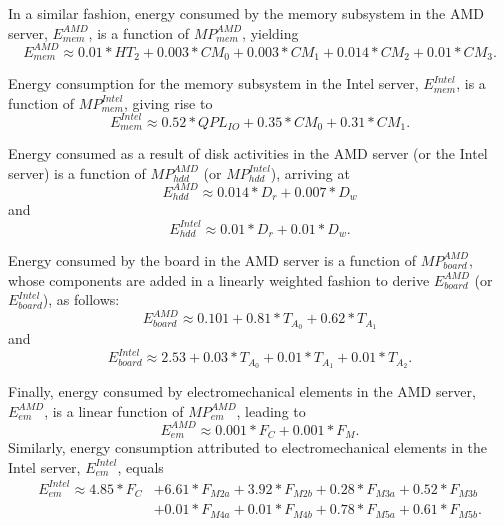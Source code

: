 In a similar fashion, energy consumed by the memory subsystem in the AMD server,
$E_{mem}^{AMD}$, is a function of $MP_{mem}^{AMD}$, yielding
\begin{equation*}
  \label{eq:apxmem}
  E_{mem}^{AMD} \approx 0.01*HT_{2}+0.003*CM_{0}+0.003*CM_{1}+0.014*CM_{2}+0.01*CM_{3}.
\end{equation*}

Energy consumption for the memory subsystem in the Intel server,
$E_{mem}^{Intel}$, is a function of $MP_{mem}^{Intel}$, giving rise to
\begin{equation*}
  E_{mem}^{Intel} \approx 0.52*QPL_{IO}+0.35*CM_{0}+0.31*CM_{1}. 
\end{equation*}

Energy consumed as a result of disk activities in the AMD server (or the
Intel server) is a function of $MP_{hdd}^{AMD}$ (or $MP_{hdd}^{Intel}$),
arriving at 
\begin{equation*}
E_{hdd}^{AMD} \approx 0.014*D_{r}+0.007*D_{w}
\end{equation*}
and
\begin{equation*}
E_{hdd}^{Intel} \approx 0.01*D_{r}+0.01*D_{w}.
\end{equation*}

Energy consumed by the board in the AMD server is a function of $MP_{board}^{AMD}$,
whose components are added in a linearly weighted fashion to derive
$E_{board}^{AMD}$ (or $E_{board}^{Intel}$), as follows:
\begin{equation*}
E_{board}^{AMD} \approx 0.101+0.81*T_{A_{0}}+0.62*T_{A_{1}}
\end{equation*}
and
\begin{equation*}
E_{board}^{Intel} \approx 2.53+0.03*T_{A_{0}}+0.01*T_{A_{1}}+0.01*T_{A_{2}}.
\end{equation*}

Finally, energy consumed by electromechanical elements in the AMD server, $E_{em}^{AMD}$,
is a linear function of $MP_{em}^{AMD}$, leading to
\begin{equation*}
E_{em}^{AMD} \approx 0.001*F_{C}+0.001*F_{M}.
\end{equation*}
Similarly, energy consumption attributed to electromechanical elements in the Intel server, $E_{em}^{Intel}$, equals
\begin{align*}
E_{em}^{Intel}\approx4.85*F_{C}&+6.61*F_{M2a}+3.92*F_{M2b}+0.28*F_{M3a}+0.52*F_{M3b}\\
            &+0.01*F_{M4a}+0.01*F_{M4b}+0.78*F_{M5a}+0.61*F_{M5b}.
\end{align*}

